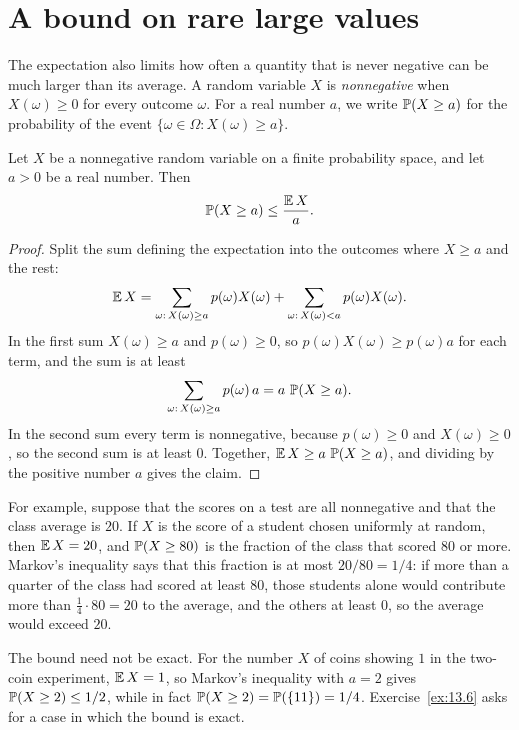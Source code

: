 \section{A bound on rare large values}\label{ch13:sec:markov}
The expectation also limits how often a quantity that is never negative can be much larger than its average. A random variable $X$ is \emph{nonnegative} when $X(\omega)\ge0$ for every outcome $\omega$. For a real number $a$, we write $\operatorname{\mathbb P}(X\ge a)$ for the probability of the event $\{\omega\in\Omega:X(\omega)\ge a\}$.

\par\noindent\begin{minipage}{\linewidth}
\begin{proposition}\label{ch13:prop:markov}
Let $X$ be a nonnegative random variable on a finite probability space, and let $a>0$ be a real number. Then
\[
\operatorname{\mathbb P}(X\ge a)\le\frac{\operatorname{\mathbb E} X}{a}.
\]
\end{proposition}
\end{minipage}\par

\begin{proof}
Split the sum defining the expectation into the outcomes where $X\ge a$ and the rest:
\[
\operatorname{\mathbb E} X=\sum_{\omega:\,X(\omega)\ge a}p(\omega)X(\omega)+\sum_{\omega:\,X(\omega)<a}p(\omega)X(\omega).
\]
In the first sum $X(\omega)\ge a$ and $p(\omega)\ge0$, so $p(\omega)X(\omega)\ge p(\omega)a$ for each term, and the sum is at least
\[
\sum_{\omega:\,X(\omega)\ge a}p(\omega)\,a=a\,\operatorname{\mathbb P}(X\ge a).
\]
In the second sum every term is nonnegative, because $p(\omega)\ge0$ and $X(\omega)\ge0$, so the second sum is at least $0$. Together, $\operatorname{\mathbb E} X\ge a\,\operatorname{\mathbb P}(X\ge a)$, and dividing by the positive number $a$ gives the claim.
\end{proof}

For example, suppose that the scores on a test are all nonnegative and that the class average is $20$. If $X$ is the score of a student chosen uniformly at random, then $\operatorname{\mathbb E} X=20$, and $\operatorname{\mathbb P}(X\ge80)$ is the fraction of the class that scored $80$ or more. Markov's inequality says that this fraction is at most $20/80=1/4$: if more than a quarter of the class had scored at least $80$, those students alone would contribute more than $\tfrac14\cdot80=20$ to the average, and the others at least $0$, so the average would exceed $20$.

The bound need not be exact. For the number $X$ of coins showing $1$ in the two-coin experiment, $\operatorname{\mathbb E} X=1$, so Markov's inequality with $a=2$ gives $\operatorname{\mathbb P}(X\ge2)\le1/2$, while in fact $\operatorname{\mathbb P}(X\ge2)=\operatorname{\mathbb P}(\{11\})=1/4$. Exercise~\ref{ex:13.6} asks for a case in which the bound is exact.

